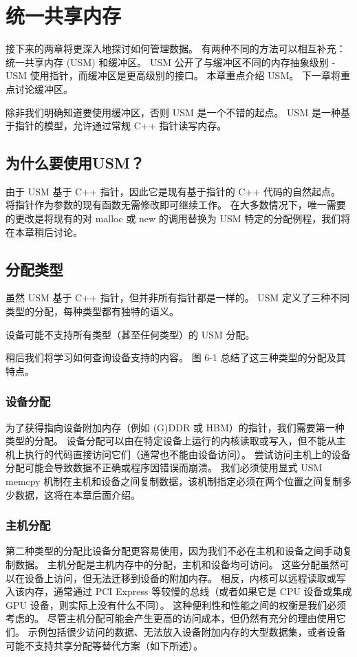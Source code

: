 \section{统一共享内存}
接下来的两章将更深入地探讨如何管理数据。 有两种不同的方法可以相互补充：统一共享内存 (USM) 和缓冲区。 USM 公开了与缓冲区不同的内存抽象级别 - USM 使用指针，而缓冲区是更高级别的接口。 本章重点介绍 USM。 下一章将重点讨论缓冲区。

除非我们明确知道要使用缓冲区，否则 USM 是一个不错的起点。 USM 是一种基于指针的模型，允许通过常规 C++ 指针读写内存。

\subsection{为什么要使用USM？}
由于 USM 基于 C++ 指针，因此它是现有基于指针的 C++ 代码的自然起点。 将指针作为参数的现有函数无需修改即可继续工作。 在大多数情况下，唯一需要的更改是将现有的对 malloc 或 new 的调用替换为 USM 特定的分配例程，我们将在本章稍后讨论。

\subsection{分配类型}
虽然 USM 基于 C++ 指针，但并非所有指针都是一样的。 USM 定义了三种不同类型的分配，每种类型都有独特的语义。

设备可能不支持所有类型（甚至任何类型）的 USM 分配。

稍后我们将学习如何查询设备支持的内容。 图 6-1 总结了这三种类型的分配及其特点。

\subsubsection{设备分配}
为了获得指向设备附加内存（例如 (G)DDR 或 HBM）的指针，我们需要第一种类型的分配。 设备分配可以由在特定设备上运行的内核读取或写入，但不能从主机上执行的代码直接访问它们（通常也不能由设备访问）。 尝试访问主机上的设备分配可能会导致数据不正确或程序因错误而崩溃。 我们必须使用显式 USM memcpy 机制在主机和设备之间复制数据，该机制指定必须在两个位置之间复制多少数据，这将在本章后面介绍。

\subsubsection{主机分配}
第二种类型的分配比设备分配更容易使用，因为我们不必在主机和设备之间手动复制数据。 主机分配是主机内存中的分配，主机和设备均可访问。 这些分配虽然可以在设备上访问，但无法迁移到设备的附加内存。 相反，内核可以远程读取或写入该内存，通常通过 PCI Express 等较慢的总线（或者如果它是 CPU 设备或集成 GPU 设备，则实际上没有什么不同）。 这种便利性和性能之间的权衡是我们必须考虑的。 尽管主机分配可能会产生更高的访问成本，但仍然有充分的理由使用它们。 示例包括很少访问的数据、无法放入设备附加内存的大型数据集，或者设备可能不支持共享分配等替代方案（如下所述）。

